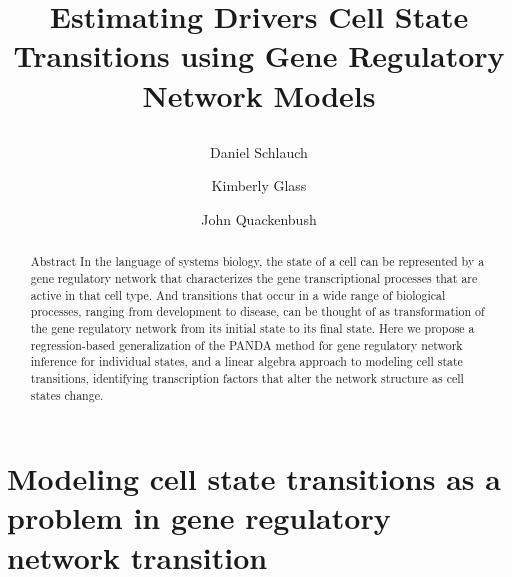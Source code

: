 \documentclass[english]{article}
\begin{document}
\title{Estimating Drivers Cell State Transitions using Gene Regulatory Network
Models\author[1]{Daniel Schlauch} 
\author[2,3]{Kimberly Glass} 
\author[1,3]{John Quackenbush} 
}
\maketitle
\begin{abstract}
Abstract In the language of systems biology, the state of a cell can
be represented by a gene regulatory network that characterizes the
gene transcriptional processes that are active in that cell type.
And transitions that occur in a wide range of biological processes,
ranging from development to disease, can be thought of as transformation
of the gene regulatory network from its initial state to its final
state. Here we propose a regression-based generalization of the PANDA
method for gene regulatory network inference for individual states,
and a linear algebra approach to modeling cell state transitions,
identifying transcription factors that alter the network structure
as cell states change.
\end{abstract}

\section*{Modeling cell state transitions as a problem in gene regulatory network
transition }
\end{document}
